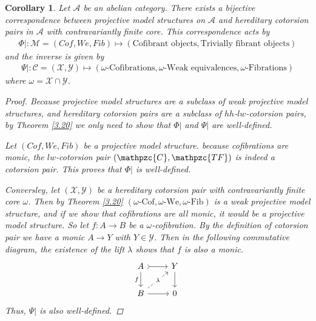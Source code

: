 \documentclass[12pt]{amsart}
\numberwithin{equation}{section}
\newtheorem{corollary}[lemma]{Corollary}
\theoremstyle{definition}
\newtheorem*{theorem 0*}{Theorem}
\newtheorem*{theorem a*}{Theorem A}
\newtheorem*{theorem b*}{Theorem B}
\newcounter{diagram}
\numberwithin{diagram}{section}
\begin{document}
\begin{corollary}\label{3.21}
Let $\mathcal{A}$ be an abelian category. There exists a bijective correspondence between projective model structures on $\mathcal{A}$ and hereditary cotorsion pairs in $\mathcal{A}$ with contravariantly finite core. This correspondence acts by
\begin{align*}
\Phi|:\mathcal{M}=(Cof,We,Fib)\longmapsto (\text{Cofibrant objects},\text{Trivially fibrant objects})
\end{align*}
and the inverse is given by
\begin{align*}
\Psi|:\mathcal{C}=(\mathcal{X},\mathcal{Y})\longmapsto (\omega\text{-Cofibrations},\omega\text{-Weak equivalences}, \omega\text{-Fibrations})
\end{align*}
where $\omega=\mathcal{X}\cap\mathcal{Y}$.
\begin{proof}
Because projective model structures are a subclass of weak projective model structures, and hereditary cotorsion pairs are a subclass of $hh$-$lw$-cotorsion pairs, by Theorem \ref{3.20} we only need to show that $\Phi|$ and $\Psi|$ are well-defined.

Let $(Cof,We,Fib)$ be a projective model structure. because cofibrations are monic, the $lw$-cotorsion pair $(\mathpzc{C},\mathpzc{TF})$ is indeed a cotorsion pair. This proves that $\Phi|$ is well-defined.

Conversley, let $(\mathcal{X},\mathcal{Y})$ be a hereditary cotorsion pair with 
contravariantly finite core $\omega$. Then by Theorem \ref{3.20} $(\omega\text{-Cof},\omega\text{-We},\omega\text{-Fib})$ is a weak projective model structure, and if we show that cofibrations are all monic, it would be a projective model structure. So let $f:A\rightarrow B$ be a $\omega$-cofibration. By the definition of cotorsion pair we 
have a monic $A\rightarrow Y$ with $Y\in\mathcal{Y}$. Then in the following commutative diagram, the 
existence of the lift $\lambda$ shows that $f$ is also a monic.
\[\begin{tikzcd}
	A & Y \\
	B & 0
	\arrow[tail, from=1-1, to=1-2]
	\arrow["f"', from=1-1, to=2-1]
	\arrow[from=1-2, to=2-2]
	\arrow["\lambda"{description}, dashed, from=2-1, to=1-2]
	\arrow[from=2-1, to=2-2]
\end{tikzcd}\]
Thus, $\Psi|$ is also well-defined.
\end{proof}
\end{corollary}

\end{document}
